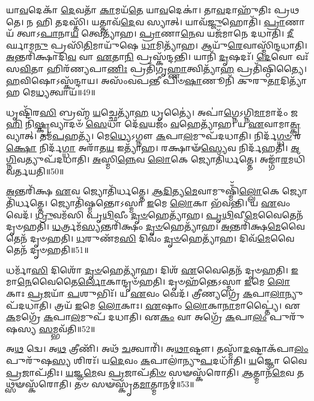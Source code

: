 𑌯𑌾\-\ul{𑌵}\-𑌦𑍇𑌕𑌾᳴ \ul{𑌦𑍇}\-𑌵𑌤𑌾᳴ \ul{𑌕𑌾}\-𑌮𑌯᳴\-\ul{𑌤𑍇} 𑌯𑌾\-\ul{𑌵}\-𑌦𑍇𑌕𑌾॑।
𑌤𑌾\-\ul{𑌵}\-𑌦𑌾𑌹𑍁᳴𑌤𑌿𑌃 𑌪𑍍𑌰𑌥𑌤𑍇।
𑌨 𑌹𑌿 𑌤𑌦𑌸𑍍𑌤𑌿᳴।
𑌯𑌤𑍍𑌤𑌾𑌵᳴\-\ul{𑌦𑍇}\-𑌵 𑌸𑍍𑌯𑌾𑌤𑍍।
𑌯𑌾𑌵᳴\-\ul{𑌜𑍍𑌜𑍁}\-𑌹𑍋𑌤𑌿᳴।
\-\ul{𑌪𑍍𑌰𑌾}\-𑌣𑌾𑌯᳴ 𑌤𑍍𑌵𑌾\-𑌽\-\ul{𑌪𑌾}\-𑌨𑌾\-\ul{𑌯} 𑌤𑍍𑌵𑍇𑌤𑍍𑌯𑌾᳴𑌹।
\-\ul{𑌪𑍍𑌰𑌾}\-𑌣𑌾\-\ul{𑌨𑍇}\-𑌵 𑌯𑌜᳴𑌮𑌾𑌨𑍇 𑌦𑌧𑌾𑌤𑌿।
\-\ul{𑌦𑍀}\-𑌰𑍍𑌘𑌾𑌮\-\ul{𑌨𑍁} 𑌪𑍍𑌰𑌸𑌿᳴\-\ul{𑌤𑌿}\-𑌮𑌾𑌯𑍁᳴𑌷𑍇 \ul{𑌧𑌾}\-𑌮𑌿𑌤𑍍𑌯𑌾᳴𑌹।
𑌆𑌯𑍁᳴\-\ul{𑌰𑍇}\-𑌵𑌾𑌸𑍍𑌮𑌿᳴𑌨𑍍𑌦𑌧𑌾𑌤𑌿।
\-\ul{𑌅}\-𑌨𑍍𑌤𑌰𑌿᳴𑌕𑍍𑌷𑌾𑌦𑌿\-\ul{𑌵} 𑌵𑌾 \ul{𑌏}\-𑌤𑌾\-\ul{𑌨𑌿} 𑌪𑍍𑌰𑌸𑍍𑌕᳴𑌨𑍍𑌦𑌨𑍍𑌤𑌿।
𑌯𑌾𑌨𑌿᳴ \ul{𑌦𑍃}\-𑌷𑌦𑌃᳴।
\-\ul{𑌦𑍇}\-𑌵𑍋 𑌵𑌃᳴ 𑌸\-\ul{𑌵𑌿}\-𑌤𑌾 𑌹𑌿𑌰᳴𑌣𑍍𑌯𑌪𑌾\-\ul{𑌣𑌿𑌃} 𑌪𑍍𑌰𑌤𑌿᳴\-𑌗𑍃\-\ul{𑌹𑍍𑌣𑌾}\-𑌤𑍍𑌵𑌿𑌤𑍍𑌯𑌾᳴\-\ul{𑌹} 𑌪𑍍𑌰𑌤𑌿᳴\-𑌷𑍍𑌠𑌿𑌤𑍍𑌯𑍈।
\-\ul{𑌹}\-𑌵𑌿𑌷𑍋\-𑌽𑌸𑍍𑌕᳴𑌨𑍍𑌦𑌾𑌯।
𑌅𑌸𑌂᳴𑌵𑌪𑌨𑍍𑌤𑍀 𑌪𑌿𑍞\-\ul{𑌷𑌾}\-𑌣𑍂𑌨𑌿᳴ 𑌕𑍁𑌰𑍁\-\ul{𑌤𑌾}\-𑌦𑌿𑌤𑍍𑌯𑌾᳴𑌹 𑌮𑍇\-\ul{𑌧𑍍𑌯}\-𑌤𑍍𑌵𑌾𑌯᳴॥49॥\anuvakamend[𑌨𑌿𑌲𑌾᳴𑌯\-\ul{𑌤} 𑌵𑌿𑌧𑍃᳴𑌤𑍍𑌯𑍈 \ul{𑌵𑍀}\-𑌰𑍍𑌯𑍇᳴𑌣 𑌸𑍍𑌕𑌨𑍍𑌦𑌨𑍍𑌤𑌿 \ul{𑌚}\-𑌤𑍍𑌵𑌾𑌰𑌿᳴ 𑌚]

𑌧𑍃𑌷𑍍𑌟𑌿᳴𑌰\-\ul{𑌸𑌿} 𑌬𑍍𑌰𑌹𑍍𑌮᳴ \ul{𑌯}\-𑌚𑍍𑌛𑍇𑌤𑍍𑌯𑌾᳴\-\ul{𑌹} 𑌧𑍃𑌤𑍍𑌯𑍈॑।
𑌅𑌪𑌾॑\-\ul{𑌗𑍍𑌨𑍇}\-\-𑌽𑌗𑍍𑌨𑌿\-\ul{𑌮𑌾}\-𑌮𑌾𑌦𑌂᳴ 𑌜\-\ul{𑌹𑌿} 𑌨𑌿\-\ul{𑌷𑍍𑌕𑍍𑌰}\-𑌵𑍍𑌯𑌾𑌦𑍞᳴ \ul{𑌸𑍇}\-𑌧𑌾 𑌦𑍇᳴\-\ul{𑌵}\-𑌯𑌜𑌂᳴ \ul{𑌵}\-𑌹𑍇𑌤𑍍𑌯𑌾᳴𑌹।
𑌯 \ul{𑌏}\-𑌵𑌾𑌮𑌾\-\ul{𑌤𑍍𑌕𑍍𑌰}\-𑌵𑍍𑌯𑌾𑌤𑍍।
𑌤𑌮᳴\-\ul{𑌪}\-𑌹𑌤𑍍𑌯᳴।
𑌮𑍇\-\ul{𑌧𑍍𑌯𑍇}\-\-𑌽𑌗𑍍𑌨𑍗 \ul{𑌕}\-𑌪𑌾\-\ul{𑌲}\-𑌮𑍁𑌪᳴𑌦𑌧𑌾𑌤𑌿।
𑌨𑌿𑌰𑍍𑌦᳴\-\ul{𑌗𑍍𑌧}\-\-\ul{𑍞} 𑌰\-\ul{𑌕𑍍𑌷𑍋} 𑌨𑌿𑌰𑍍𑌦᳴\-\ul{𑌗𑍍𑌧𑌾} 𑌅𑌰𑌾᳴𑌤\-\ul{𑌯} 𑌇𑌤𑍍𑌯𑌾᳴𑌹।
𑌰𑌕𑍍𑌷𑌾𑍟᳴\-\ul{𑌸𑍍𑌯𑍇}\-𑌵 𑌨𑌿𑌰𑍍𑌦᳴𑌹𑌤𑌿।
\-\ul{𑌅}\-\-\ul{𑌗𑍍𑌨𑌿}\-𑌵𑌤𑍍𑌯𑍁𑌪᳴𑌦𑌧𑌾𑌤𑌿।
\-\ul{𑌅}\-𑌸𑍍𑌮𑌿\-\ul{𑌨𑍍𑌨𑍇}\-𑌵 \ul{𑌲𑍋}\-𑌕𑍇 𑌜𑍍𑌯𑍋𑌤𑌿᳴𑌰𑍍𑌧𑌤𑍍𑌤𑍇।
𑌅𑌙𑍍𑌗𑌾᳴\-\ul{𑌰}\-𑌮𑌧𑌿᳴ 𑌵𑌰𑍍𑌤𑌯𑌤𑌿॥50॥

\-\ul{𑌅}\-𑌨𑍍𑌤𑌰𑌿᳴𑌕𑍍𑌷 \ul{𑌏}\-𑌵 𑌜𑍍𑌯𑍋𑌤𑌿᳴𑌰𑍍𑌧𑌤𑍍𑌤𑍇।
\-\ul{𑌆}\-\-\ul{𑌦𑌿}\-𑌤𑍍𑌯\-\ul{𑌮𑍇}\-𑌵𑌾𑌮𑍁𑌷𑍍𑌮𑌿𑌁᳴\-\ul{𑌲𑍍𑌲𑍋}\-𑌕𑍇 𑌜𑍍𑌯𑍋𑌤𑌿᳴𑌰𑍍𑌧𑌤𑍍𑌤𑍇।
𑌜𑍍𑌯𑍋𑌤𑌿᳴𑌷𑍍𑌮𑌨𑍍𑌤𑍋\-𑌽𑌸𑍍𑌮𑌾 \ul{𑌇}\-𑌮𑍇 \ul{𑌲𑍋}\-𑌕𑌾 𑌭᳴𑌵𑌨𑍍𑌤𑌿।
𑌯 \ul{𑌏}\-𑌵𑌂 𑌵𑍇𑌦᳴।
\-\ul{𑌧𑍍𑌰𑍁}\-𑌵𑌮᳴𑌸𑌿 𑌪𑍃\-\ul{𑌥𑌿}\-𑌵𑍀𑌂 \ul{𑌦𑍃}\-\-\ul{𑍞}\-𑌹𑍇𑌤𑍍𑌯𑌾᳴𑌹।
\-\ul{𑌪𑍃}\-\-\ul{𑌥𑌿}\-𑌵𑍀\-\ul{𑌮𑍇}\-𑌵𑍈𑌤𑍇𑌨᳴ 𑌦𑍃𑍞𑌹𑌤𑌿।
\-\ul{𑌧}\-𑌰𑍍𑌤𑍍𑌰𑌮᳴\-\ul{𑌸𑍍𑌯}\-𑌨𑍍𑌤𑌰𑌿᳴𑌕𑍍𑌷𑌂 \ul{𑌦𑍃}\-\-\ul{𑍞}\-𑌹𑍇𑌤𑍍𑌯𑌾᳴𑌹।
\-\ul{𑌅}\-𑌨𑍍𑌤𑌰𑌿᳴𑌕𑍍𑌷\-\ul{𑌮𑍇}\-𑌵𑍈𑌤𑍇𑌨᳴ 𑌦𑍃𑍞𑌹𑌤𑌿।
\-\ul{𑌧}\-𑌰𑍁𑌣᳴𑌮\-\ul{𑌸𑌿} 𑌦𑌿𑌵𑌂᳴ \ul{𑌦𑍃}\-\-\ul{𑍞}\-𑌹𑍇𑌤𑍍𑌯𑌾᳴𑌹।
𑌦𑌿𑌵᳴\-\ul{𑌮𑍇}\-𑌵𑍈𑌤𑍇𑌨᳴ 𑌦𑍃𑍞𑌹𑌤𑌿॥51॥

𑌧𑌰𑍍𑌮𑌾᳴\-\ul{𑌸𑌿} 𑌦𑌿𑌶𑍋᳴ \ul{𑌦𑍃}\-\-\ul{𑍞}\-𑌹𑍇𑌤𑍍𑌯𑌾᳴𑌹।
𑌦𑌿𑌶᳴ \ul{𑌏}\-𑌵𑍈𑌤𑍇𑌨᳴ 𑌦𑍃𑍞𑌹𑌤𑌿।
\-\ul{𑌇}\-𑌮𑌾\-\ul{𑌨𑍇}\-𑌵𑍈𑌤𑍈\-\ul{𑌰𑍍𑌲𑍋}\-𑌕𑌾𑌨𑍍𑌦𑍃𑍞᳴𑌹𑌤𑌿।
𑌦𑍃𑍞𑌹᳴𑌨𑍍𑌤𑍇\-𑌽𑌸𑍍𑌮𑌾 \ul{𑌇}\-𑌮𑍇 \ul{𑌲𑍋}\-𑌕𑌾𑌃 \ul{𑌪𑍍𑌰}\-𑌜𑌯𑌾᳴ \ul{𑌪}\-𑌶𑍁𑌭𑌿𑌃᳴।
𑌯 \ul{𑌏}\-𑌵𑌂 𑌵𑍇𑌦᳴।
𑌤𑍍𑌰𑍀𑌣𑍍𑌯𑌗𑍍𑌰𑍇᳴ \ul{𑌕}\-𑌪𑌾\-\ul{𑌲𑌾}\-𑌨𑍍𑌯𑍁𑌪᳴𑌦𑌧𑌾𑌤𑌿।
𑌤𑍍𑌰𑌯᳴ \ul{𑌇}\-𑌮𑍇 \ul{𑌲𑍋}\-𑌕𑌾𑌃।
\-\ul{𑌏}\-𑌷𑌾𑌂 \ul{𑌲𑍋}\-𑌕𑌾\-\ul{𑌨𑌾}\-𑌮𑌾𑌪𑍍𑌤𑍍𑌯𑍈॑।
𑌏\-\ul{𑌕}\-𑌮𑌗𑍍𑌰𑍇᳴ \ul{𑌕}\-𑌪𑌾\-\ul{𑌲}\-𑌮𑍁𑌪᳴ 𑌦𑌧𑌾𑌤𑌿।
𑌏\-\ul{𑌕𑌂} 𑌵𑌾 𑌅𑌗𑍍𑌰𑍇᳴ \ul{𑌕}\-𑌪𑌾\-\ul{𑌲𑌂} 𑌪𑍁𑌰𑍁᳴𑌷𑌸𑍍𑌯 \ul{𑌸}\-𑌮𑍍𑌭𑌵᳴𑌤𑌿॥52॥

𑌅\-\ul{𑌥} 𑌦𑍍𑌵𑍇।
𑌅\-\ul{𑌥} 𑌤𑍍𑌰𑍀𑌣𑌿᳴।
𑌅𑌥᳴ \ul{𑌚}\-𑌤𑍍𑌵𑌾𑌰𑌿᳴।
𑌅\-\ul{𑌥𑌾}\-𑌷𑍍𑌟𑍗।
𑌤𑌸𑍍𑌮𑌾᳴\-\ul{𑌦}\-𑌷𑍍𑌟𑌾\-𑌕᳴𑌪𑌾\-\ul{𑌲𑌂} 𑌪𑍁𑌰𑍁᳴𑌷\-\ul{𑌸𑍍𑌯} 𑌶𑌿𑌰𑌃᳴।
𑌯\-\ul{𑌦𑍇}\-𑌵𑌂 \ul{𑌕}\-𑌪𑌾𑌲𑌾॑𑌨𑍍𑌯𑍁\-\ul{𑌪}\-𑌦𑌧𑌾᳴𑌤𑌿।
\-\ul{𑌯}\-𑌜𑍍𑌞𑍋 𑌵𑍈 \ul{𑌪𑍍𑌰}\-𑌜𑌾\-𑌪᳴𑌤𑌿𑌃।
\-\ul{𑌯}\-𑌜𑍍𑌞\-\ul{𑌮𑍇}\-𑌵 \ul{𑌪𑍍𑌰}\-𑌜𑌾𑌪᳴\-\ul{𑌤𑌿}\-\-\ul{𑍞} 𑌸𑍟𑌸𑍍𑌕᳴𑌰𑍋𑌤𑌿।
\-\ul{𑌆}\-𑌤𑍍𑌮𑌾𑌨᳴\-\ul{𑌮𑍇}\-𑌵 𑌤𑌥𑍍𑌸𑍟𑌸𑍍𑌕᳴𑌰𑍋𑌤𑌿।
𑌤𑍞 𑌸𑍟𑌸𑍍𑌕𑍃᳴𑌤\-\ul{𑌮𑌾}\-𑌤𑍍𑌮𑌾𑌨𑌮𑍍॑॥53॥

